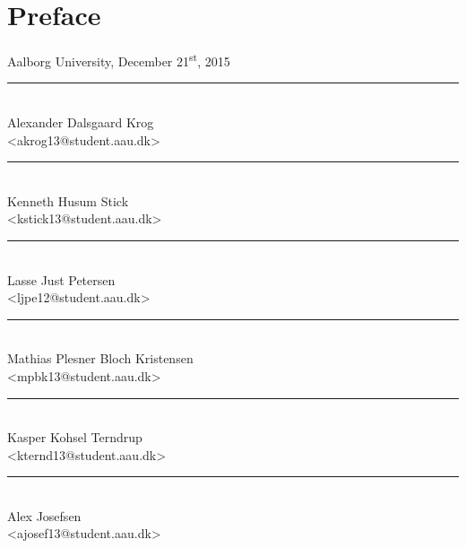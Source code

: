 \chapter*{Preface}\label{ch:preface}\label{\automlabel}

\vspace{\baselineskip}\hfill Aalborg University, December 21\textsuperscript{st}, 2015
\eal
\vfill

\noindent
\begin{minipage}[b]{0.45\textwidth}
 \centering
 \rule{\textwidth}{0.5pt}\\
  Alexander Dalsgaard Krog\\
 {\footnotesize <akrog13@student.aau.dk>}
\end{minipage}
%
\hfill
%
\begin{minipage}[b]{0.45\textwidth}
 \centering
 \rule{\textwidth}{0.5pt}\\
 Kenneth Husum Stick\\
 {\footnotesize <kstick13@student.aau.dk>}
\end{minipage}
%
\vspace{3\baselineskip}

\noindent
\begin{minipage}[b]{0.45\textwidth}
 \centering
 \rule{\textwidth}{0.5pt}\\
 Lasse Just Petersen\\
 {\footnotesize <ljpe12@student.aau.dk>}
\end{minipage}
%
\hfill
%
\begin{minipage}[b]{0.45\textwidth}
 \centering
 \rule{\textwidth}{0.5pt}\\
  Mathias Plesner Bloch Kristensen\\
 {\footnotesize <mpbk13@student.aau.dk>}
\end{minipage}
\vspace{3\baselineskip}

\noindent
\begin{minipage}[b]{0.45\textwidth}
 \centering
 \rule{\textwidth}{0.5pt}\\
 Kasper Kohsel Terndrup\\
 {\footnotesize <kternd13@student.aau.dk>}
\end{minipage}
\hfill
\begin{minipage}[b]{0.45\textwidth}
 \centering
 \rule{\textwidth}{0.5pt}\\
  Alex Josefsen\\
 {\footnotesize <ajosef13@student.aau.dk>}
\end{minipage}
\vspace{3\baselineskip}
